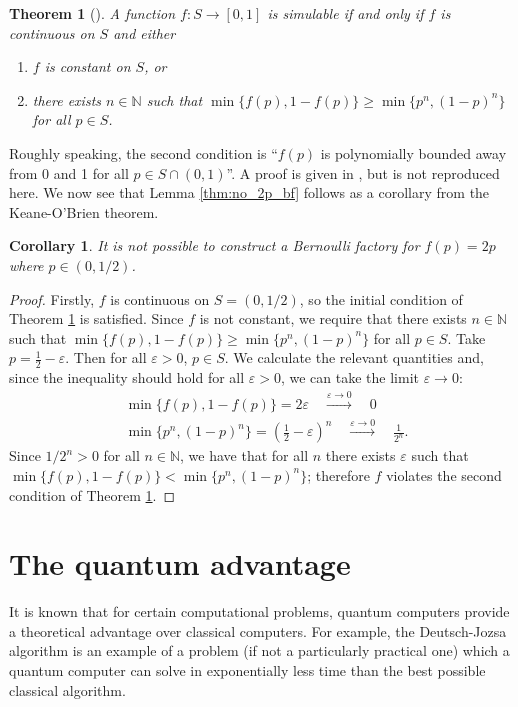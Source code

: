 \documentclass{article}
\newtheorem{thm}{Theorem}
\newtheorem{cor}{Corollary}
\theoremstyle{definition}
\begin{document}
\begin{thm}[\citet{keane1994}]\label{thm:KOB}
A function $f:S\to[0,1]$ is simulable if and only if $f$ is continuous on $S$ and either
\begin{enumerate}[label=(\alph*)]
\item $f$ is constant on $S$, or
\item there exists $n\in\mathbb{N}$ such that $\min\{f(p),1-f(p)\} \geq \min\{p^n, (1-p)^n\}$ for all $p\in S$.
\end{enumerate}
\end{thm}

Roughly speaking, the second condition is ``$f(p)$ is polynomially bounded away from 0 and 1 for all $p\in S\cap(0,1)$''. A proof is given in \citet{keane1994}, but is not reproduced here. We now see that Lemma \ref{thm:no_2p_bf} follows as a corollary from the Keane-O'Brien theorem.
\begin{cor}
It is not possible to construct a Bernoulli factory for $f(p)=2p$ where $p\in(0,1/2)$.
\end{cor}
\begin{proof}
Firstly, $f$ is continuous on $S=(0,1/2)$, so the initial condition of Theorem \ref{thm:KOB} is satisfied.
Since $f$ is not constant, we require that there exists $n\in\mathbb{N}$ such that $\min\{f(p),1-f(p)\} \geq \min\{p^n, (1-p)^n\}$ for all $p\in S$.
Take $p=\frac{1}{2} - \varepsilon$. Then for all $\varepsilon>0$, $p\in S$.
We calculate the relevant quantities and, since the inequality should hold for all $\varepsilon>0$,  we can take the limit $\varepsilon\to 0$:
\begin{align*}
&\min\{f(p),1-f(p)\} = 2\varepsilon \quad \overset{\varepsilon\to 0}{\longrightarrow}\quad 0 \\
&\min\{p^n, (1-p)^n\} = \left( \frac{1}{2} - \varepsilon \right)^n \quad \overset{\varepsilon\to 0}{\longrightarrow}\quad \frac{1}{2^n}.
\end{align*}
Since $1/2^n >0$ for all $n\in\mathbb{N}$, we have that for all $n$ there exists $\varepsilon$ such that $\min\{f(p),1-f(p)\} < \min\{p^n, (1-p)^n\}$; therefore $f$ violates the second condition of Theorem \ref{thm:KOB}.
\end{proof}

\section{The quantum advantage}
It is known that for certain computational problems, quantum computers provide a theoretical advantage over classical computers. For example, the Deutsch-Jozsa algorithm \citep{deutsch1992} is an example of a problem (if not a particularly practical one) which a quantum computer can solve in exponentially less time than the best possible classical algorithm.
\end{document}
